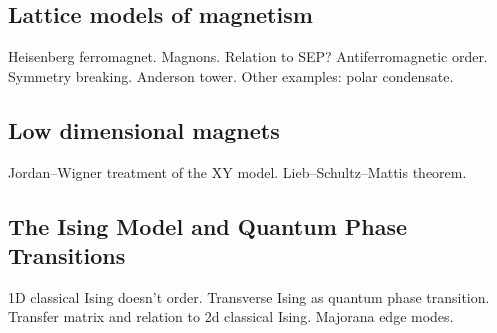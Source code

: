 \subsection{Lattice models of magnetism}

Heisenberg ferromagnet. Magnons. Relation to SEP?
Antiferromagnetic order. Symmetry breaking. Anderson tower. Other examples: polar condensate.

\subsection{Low dimensional magnets}

Jordan--Wigner treatment of the XY model. Lieb--Schultz--Mattis theorem.

\subsection{The Ising Model and Quantum Phase Transitions}

1D classical Ising doesn't order. Transverse Ising as quantum phase transition. Transfer matrix and relation to 2d classical Ising. Majorana edge modes.








